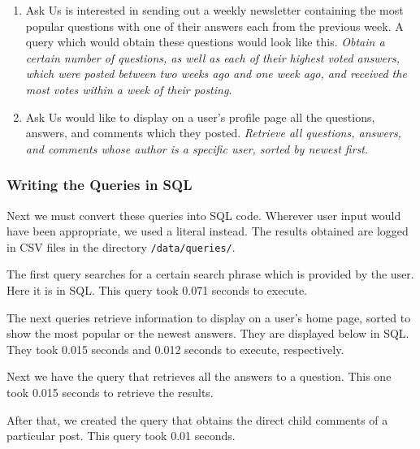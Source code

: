 \begin{enumerate}
	\item
	Ask Us is interested in sending out a weekly newsletter containing the most popular questions with one of their answers each from the previous week. A query which would obtain these questions would look like this. \emph{Obtain a certain number of questions, as well as each of their highest voted answers, which were posted between two weeks ago and one week ago, and received the most votes within a week of their posting}.

	\item
	Ask Us would like to display on a user's profile page all the questions, answers, and comments which they posted. \emph{Retrieve all questions, answers, and comments whose author is a specific user, sorted by newest first}.

\end{enumerate}

\subsubsection{Writing the Queries in SQL}

Next we must convert these queries into SQL code. Wherever user input would have been appropriate, we used a literal instead. The results obtained are logged in CSV files in the directory \verb`/data/queries/`.

The first query searches for a certain search phrase which is provided by the user. Here it is in SQL. This query took 0.071 seconds to execute.


The next queries retrieve information to display on a user's home page, sorted to show the most popular or the newest answers. They are displayed below in SQL. They took 0.015 seconds and 0.012 seconds to execute, respectively.


Next we have the query that retrieves all the answers to a question. This one took 0.015 seconds to retrieve the results.


After that, we created the query that obtains the direct child comments of a particular post. This query took 0.01 seconds.

